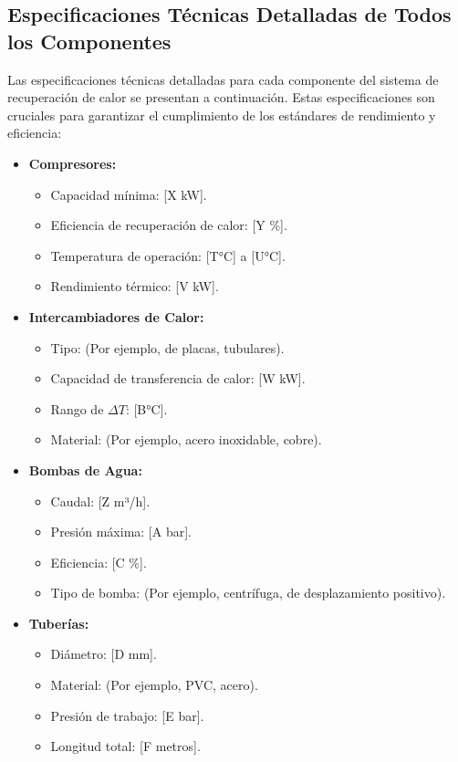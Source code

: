 \documentclass[11pt,a4paper]{article}  %
\begin{document}
\subsection{Especificaciones Técnicas Detalladas de Todos los Componentes}
Las especificaciones técnicas detalladas para cada componente del sistema de recuperación de calor se presentan a continuación. Estas especificaciones son cruciales para garantizar el cumplimiento de los estándares de rendimiento y eficiencia:

\begin{itemize}
    \item \textbf{Compresores:}
    \begin{itemize}
        \item Capacidad mínima: [X kW].
        \item Eficiencia de recuperación de calor: [Y \%].
        \item Temperatura de operación: [T°C] a [U°C].
        \item Rendimiento térmico: [V kW].
    \end{itemize}
    
    \item \textbf{Intercambiadores de Calor:}
    \begin{itemize}
        \item Tipo: (Por ejemplo, de placas, tubulares).
        \item Capacidad de transferencia de calor: [W kW].
        \item Rango de $\Delta T$: [B°C].
        \item Material: (Por ejemplo, acero inoxidable, cobre).
    \end{itemize}
    
    \item \textbf{Bombas de Agua:}
    \begin{itemize}
        \item Caudal: [Z m³/h].
        \item Presión máxima: [A bar].
        \item Eficiencia: [C \%].
        \item Tipo de bomba: (Por ejemplo, centrífuga, de desplazamiento positivo).
    \end{itemize}
    
    \item \textbf{Tuberías:}
    \begin{itemize}
        \item Diámetro: [D mm].
        \item Material: (Por ejemplo, PVC, acero).
        \item Presión de trabajo: [E bar].
        \item Longitud total: [F metros].
    \end{itemize}
    

\end{itemize}
\end{document}
